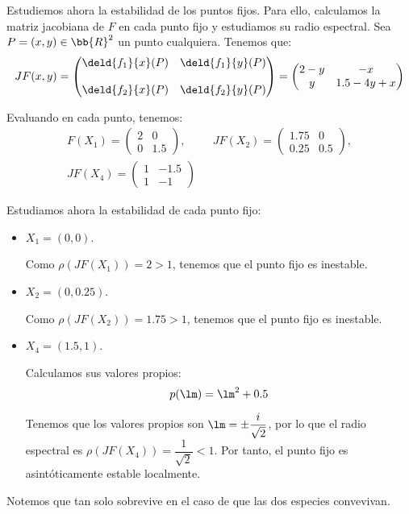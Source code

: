 \begin{ejercicio}
    Estudiemos ahora la estabilidad de los puntos fijos. Para ello,
    calculamos la matriz jacobiana de $F$ en cada punto fijo y estudiamos
    su radio espectral. Sea $P=(x,y)\in \bb{R}^2$ un punto cualquiera. Tenemos que:
    \begin{equation*}
        JF(x,y) = \begin{pmatrix}
            \deld{f_1}{x}(P) & \deld{f_1}{y}(P)\\ \\
            \deld{f_2}{x}(P) & \deld{f_2}{y}(P)
        \end{pmatrix}
        = \begin{pmatrix}
            2 - y & -x\\
            y & 1.5 - 4y + x
        \end{pmatrix}
    \end{equation*}

    Evaluando en cada punto, tenemos:
    \begin{gather*}
        F(X_1) = \begin{pmatrix}
            2 & 0\\
            0 & 1.5
        \end{pmatrix},\hspace{1cm}
        JF(X_2) = \begin{pmatrix}
            1.75 & 0\\
            0.25 & 0.5
        \end{pmatrix},\\
        JF(X_4) = \begin{pmatrix}
            1 & -1.5\\
            1 & -1
        \end{pmatrix}
    \end{gather*}

    Estudiamos ahora la estabilidad de cada punto fijo:
    \begin{itemize}
        \item $X_1=(0,0)$.
        
        Como $\rho(JF(X_1)) = 2>1$, tenemos que el punto fijo es inestable.

        \item $X_2=(0,0.25)$.
        
        Como $\rho(JF(X_2)) = 1.75>1$, tenemos que el punto fijo es inestable.

        \item $X_4=(1.5,1)$.
        
        Calculamos sus valores propios:
        \begin{equation*}
            p(\lm) = \lm^2 + 0.5
        \end{equation*}

        Tenemos que los valores propios son $\lm=\pm \dfrac{i}{\sqrt{2}}$, por lo que el radio espectral es $\rho(JF(X_4)) = \dfrac{1}{\sqrt{2}} < 1$. Por tanto, el punto fijo es asintóticamente estable localmente.
    \end{itemize}

    Notemos que tan solo sobrevive en el caso de que las dos especies convevivan.
\end{ejercicio}
